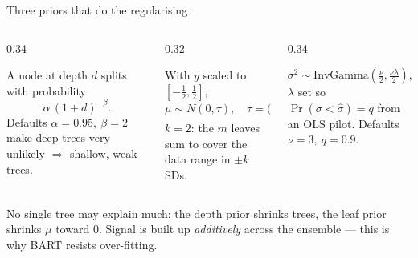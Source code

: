 \documentclass[11pt,aspectratio=169]{beamer}
\begin{document}
\begin{frame}{Three priors that do the regularising}
  \begin{columns}[T]
    \begin{column}{0.34\textwidth}
      \begin{thmbox}
        A node at depth $d$ splits with probability
        \[\alpha\,(1+d)^{-\beta}.\]
        Defaults $\alpha=0.95,\ \beta=2$ make deep trees very unlikely
        $\Rightarrow$ shallow, weak trees.
      \end{thmbox}
    \end{column}
    \begin{column}{0.32\textwidth}
      \begin{thmbox}
        With $y$ scaled to $[-\tfrac12,\tfrac12]$,
        \[\mu\sim N(0,\tau),\quad \tau=\Big(\tfrac{0.5}{k\sqrt m}\Big)^{\!2}.\]
        $k{=}2$: the $m$ leaves sum to cover the data range in $\pm k$ SDs.
      \end{thmbox}
    \end{column}
    \begin{column}{0.34\textwidth}
      \begin{thmbox}
        \[\sigma^2\sim \text{InvGamma}(\tfrac{\nu}{2},\tfrac{\nu\lambda}{2}),\]
        $\lambda$ set so $\Pr(\sigma<\hat\sigma)=q$ from an OLS pilot.
        Defaults $\nu{=}3,\ q{=}0.9$.
      \end{thmbox}
    \end{column}
  \end{columns}
  \vspace{2mm}
  \begin{keybox}
    No single tree may explain much: the depth prior shrinks trees, the leaf
    prior shrinks $\mu$ toward $0$. Signal is built up \emph{additively} across
    the ensemble --- this is why BART resists over-fitting.
  \end{keybox}
\end{frame}
\end{document}
